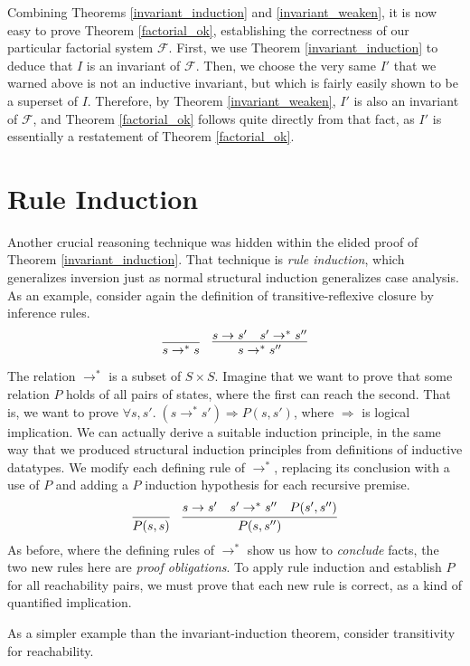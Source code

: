 \documentclass{amsbook}
\theoremstyle{definition}
\theoremstyle{remark}
\numberwithin{section}{chapter}
\numberwithin{equation}{chapter}
\begin{document}
Combining Theorems \ref{invariant_induction} and \ref{invariant_weaken}, it is now easy to prove Theorem \ref{factorial_ok}, establishing the correctness of our particular factorial system $\mathcal F$.
First, we use Theorem \ref{invariant_induction} to deduce that $I$ is an invariant of $\mathcal F$.
Then, we choose the very same $I'$ that we warned above is not an inductive invariant, but which is fairly easily shown to be a superset of $I$.
Therefore, by Theorem \ref{invariant_weaken}, $I'$ is also an invariant of $\mathcal F$, and Theorem \ref{factorial_ok} follows quite directly from that fact, as $I'$ is essentially a restatement of Theorem \ref{factorial_ok}.

\section{Rule Induction}

Another crucial reasoning technique was hidden within the elided proof of Theorem \ref{invariant_induction}.
That technique is \emph{rule induction}, which generalizes inversion just as normal structural induction generalizes case analysis.
As an example, consider again the definition of transitive-reflexive closure by inference rules.
$$\infer{s \to^* s}{}
\quad \infer{s \to^* s''}{
  s \to s'
  & s' \to^* s''
}$$

The relation $\to^*$ is a subset of $S \times S$.
Imagine that we want to prove that some relation $P$ holds of all pairs of states, where the first can reach the second.
That is, we want to prove $\forall s, s'. \; (s \to^* s') \Rightarrow P(s, s')$, where $\Rightarrow$ is logical implication.
We can actually derive a suitable induction principle, in the same way that we produced structural induction principles from definitions of inductive datatypes.
We modify each defining rule of $\to^*$, replacing its conclusion with a use of $P$ and adding a $P$ induction hypothesis for each recursive premise.
$$\infer{P(s, s)}{}
\quad \infer{P(s, s'')}{
  s \to s'
  & s' \to^* s''
  & P(s', s'')
}$$
As before, where the defining rules of $\to^*$ show us how to \emph{conclude} facts, the two new rules here are \emph{proof obligations}.
To apply rule induction and establish $P$ for all reachability pairs, we must prove that each new rule is correct, as a kind of quantified implication.

As a simpler example than the invariant-induction theorem, consider transitivity for reachability.
\end{document}
